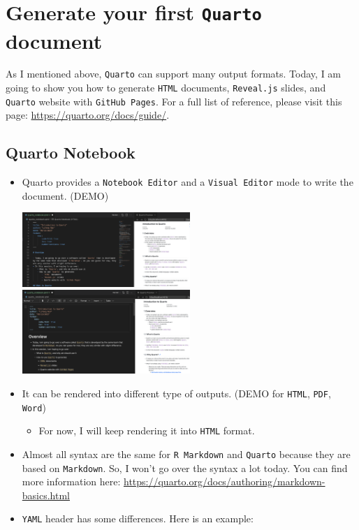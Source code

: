 \documentclass[
  letterpaper,
  DIV=11,
  numbers=noendperiod]{scrartcl}
\providecommand{\tightlist}{%
  \setlength{\itemsep}{0pt}\setlength{\parskip}{0pt}}\usepackage{longtable,booktabs,array}
\begin{document}
\hypertarget{generate-your-first-quarto-document}{%
\section{\texorpdfstring{Generate your first \texttt{Quarto}
document}{Generate your first Quarto document}}\label{generate-your-first-quarto-document}}

As I mentioned above, \texttt{Quarto} can support many output formats.
Today, I am going to show you how to generate \texttt{HTML} documents,
\texttt{Reveal.js} slides, and \texttt{Quarto} website with
\texttt{GitHub\ Pages}. For a full list of reference, please visit this
page: \url{https://quarto.org/docs/guide/}.

\hypertarget{quarto-notebook}{%
\subsection{Quarto Notebook}\label{quarto-notebook}}

\begin{itemize}
\item
  Quarto provides a \texttt{Notebook\ Editor} and a
  \texttt{Visual\ Editor} mode to write the document. (DEMO)

  \includegraphics[width=0.5\textwidth,height=\textheight]{img/notebook_editor.png}
  \includegraphics[width=0.5\textwidth,height=\textheight]{img/visual_editor.png}
\item
  It can be rendered into different type of outputs. (DEMO for
  \texttt{HTML}, \texttt{PDF}, \texttt{Word})

  \begin{itemize}
  \tightlist
  \item
    For now, I will keep rendering it into \texttt{HTML} format.
  \end{itemize}
\item
  Almost all syntax are the same for \texttt{R\ Markdown} and
  \texttt{Quarto} because they are based on \texttt{Markdown}. So, I
  won't go over the syntax a lot today. You can find more information
  here: \url{https://quarto.org/docs/authoring/markdown-basics.html}
\item
  \texttt{YAML} header has some differences. Here is an example:
\end{itemize}
\end{document}
